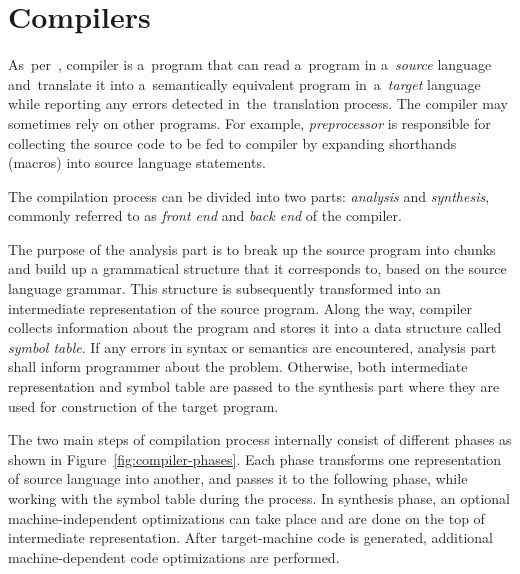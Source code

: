 \documentclass[
  digital, %
  table,   %
  lof,     %
  lot,     %
  oneside,
]{fithesis3}
\begin{document}
\chapter{Compilers}
\label{chap:compilers}
As~per~\cite{dragon-book}, compiler is a~program that can read a~program in a~\textit{source} language and~translate it into a~semantically equivalent program in~a~\textit{target} language while reporting any errors detected in~the~translation process. The compiler may sometimes rely on other programs. For example, \textit{preprocessor} is responsible for collecting the source code to be fed to compiler by expanding shorthands (macros) into source language statements. 

The compilation process can be divided into two parts: \textit{analysis} and \textit{synthesis}, commonly referred to as \textit{front end} and \textit{back end} of the compiler.

The purpose of the analysis part is to break up the source program into chunks and build up a grammatical structure that it corresponds to, based on the source language grammar. This structure is subsequently transformed into an intermediate representation of the source program. Along the way, compiler collects information about the program and stores it into a data structure called \textit{symbol table}. If any errors in syntax or semantics are encountered, analysis part shall inform programmer about the problem. Otherwise, both intermediate representation and symbol table are passed to the synthesis part where they are used for construction of the target program.

The two main steps of compilation process internally consist of different phases as shown in Figure~\ref{fig:compiler-phases}. Each phase transforms one representation of source language into another, and passes it to the following phase, while working with the symbol table during the process. In synthesis phase, an optional machine-independent optimizations can take place and are done on the top of intermediate representation. After target-machine code is generated, additional machine-dependent code optimizations are performed.
\end{document}
